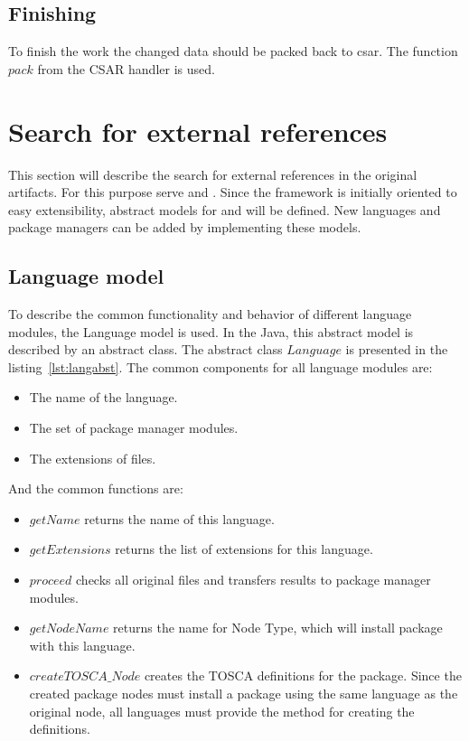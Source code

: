 \subsection*{Finishing}
To finish the work the changed data should be packed back to \gls{csar}.
The function $pack$ from the CSAR handler is used.

\section{Search for external references} 
This section will describe the search for external references in the original artifacts. %
For this purpose serve  and .
Since the framework is initially oriented to easy extensibility, abstract models for  and  will be defined.
New languages and package managers can be added by implementing these models.

\subsection*{Language model}
To describe the common functionality and behavior of different language modules, the Language model is used. 
In the Java, this abstract model is described by an abstract class. 
The abstract class $Language$ is presented in the listing~\ref{lst:langabst}.
The common components for all language modules are: 
\begin{itemize}
	\item The name of the language.
	\item The set of package manager modules.
	\item The extensions of files.
\end{itemize}
And the common functions are: 
\begin{itemize}
	\item $getName$ returns the name of this language.
	\item $getExtensions$ returns the list of extensions for this language.
	\item $proceed$ checks all original files and transfers results to package manager modules.
	\item $getNodeName$ returns the name for Node Type, which will install package with this language.
	\item $createTOSCA\_Node$ creates the TOSCA definitions for the package. 
	Since the created package nodes must install a package using the same language as the original node, all languages must provide the method for creating the definitions.
\end{itemize}

